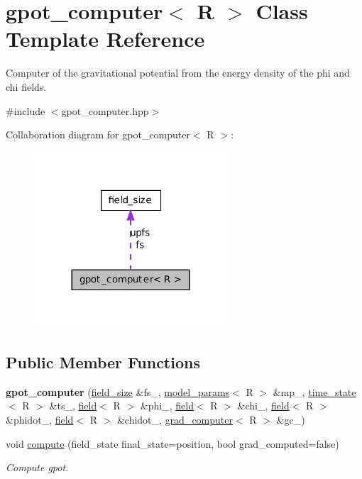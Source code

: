 \hypertarget{classgpot__computer}{
\section{gpot\_\-computer$<$ R $>$ Class Template Reference}
\label{classgpot__computer}
}


Computer of the gravitational potential from the energy density of the phi and chi fields.  




{\ttfamily \#include $<$gpot\_\-computer.hpp$>$}



Collaboration diagram for gpot\_\-computer$<$ R $>$:
\nopagebreak
\begin{figure}[H]
\begin{center}
\leavevmode
\includegraphics[width=204pt]{classgpot__computer__coll__graph}
\end{center}
\end{figure}
\subsection*{Public Member Functions}
\begin{DoxyCompactItemize}
\item 
\hypertarget{classgpot__computer_a31be021e9e6658a22bd07354e7e955a1}{
{\bfseries gpot\_\-computer} (\hyperlink{structfield__size}{field\_\-size} \&fs\_\-, \hyperlink{structmodel__params}{model\_\-params}$<$ R $>$ \&mp\_\-, \hyperlink{structtime__state}{time\_\-state}$<$ R $>$ \&ts\_\-, \hyperlink{classfield}{field}$<$ R $>$ \&phi\_\-, \hyperlink{classfield}{field}$<$ R $>$ \&chi\_\-, \hyperlink{classfield}{field}$<$ R $>$ \&phidot\_\-, \hyperlink{classfield}{field}$<$ R $>$ \&chidot\_\-, \hyperlink{classgrad__computer}{grad\_\-computer}$<$ R $>$ \&gc\_\-)}
\label{classgpot__computer_a31be021e9e6658a22bd07354e7e955a1}

\item 
void \hyperlink{classgpot__computer_adb1fb91c67e82a028c8c161007215915}{compute} (field\_\-state final\_\-state=position, bool grad\_\-computed=false)
\begin{DoxyCompactList}\small\item\em Compute gpot. \item\end{DoxyCompactList}\end{DoxyCompactItemize}
